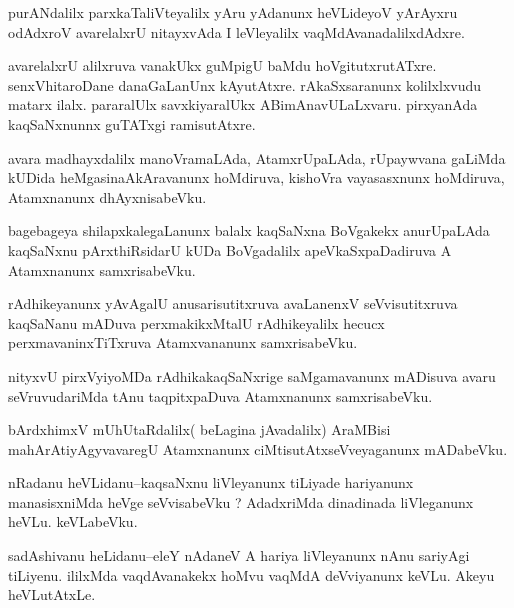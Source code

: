 \documentclass{article}
\begin{document}
\begin{mn}%
purANdalilx parxkaTaliVteyalilx yAru yAdanunx heVLideyoV yArAyxru odAdxroV avarelalxrU 
nitayxvAda I leVleyalilx vaqMdAvanadalilxdAdxre.
\end{mn}

\begin{mn}%
avarelalxrU alilxruva vanakUkx guMpigU baMdu hoVgitutxrutATxre. senxVhitaroDane 
danaGaLanUnx kAyutAtxre. rAkaSxsaranunx kolilxlxvudu matarx ilalx. pararalUlx 
savxkiyaralUkx ABimAnavULaLxvaru. pirxyanAda kaqSaNxnunnx guTATxgi ramisutAtxre.
\end{mn}

\begin{mn}%
avara madhayxdalilx manoVramaLAda, AtamxrUpaLAda, rUpaywvana gaLiMda kUDida 
heMgasinaAkAravanunx hoMdiruva, kishoVra vayasasxnunx hoMdiruva, Atamxnanunx 
dhAyxnisabeVku.
\end{mn}

\begin{mn}%
bagebageya shilapxkalegaLanunx balalx kaqSaNxna BoVgakekx anurUpaLAda kaqSaNxnu 
pArxthiRsidarU kUDa BoVgadalilx apeVkaSxpaDadiruva A Atamxnanunx samxrisabeVku.
\end{mn}

\begin{mn}%
rAdhikeyanunx yAvAgalU anusarisutitxruva avaLanenxV seVvisutitxruva kaqSaNanu mADuva 
perxmakikxMtalU rAdhikeyalilx hecucx perxmavaninxTiTxruva Atamxvananunx samxrisabeVku.
\end{mn}

\begin{mn}%
nityxvU pirxVyiyoMDa rAdhikakaqSaNxrige saMgamavanunx mADisuva avaru seVruvudariMda tAnu 
taqpitxpaDuva Atamxnanunx samxrisabeVku.
\end{mn}

\begin{mn}%
bArdxhimxV mUhUtaRdalilx( beLagina jAvadalilx) AraMBisi mahArAtiyAgyvavaregU Atamxnanunx 
ciMtisutAtxseVveyaganunx mADabeVku.
\end{mn}

\begin{mn}%
nRadanu heVLidanu--kaqsaNxnu liVleyanunx tiLiyade hariyanunx manasisxniMda heVge 
seVvisabeVku ? AdadxriMda dinadinada liVleganunx heVLu. keVLabeVku.
\end{mn}

\begin{mn}%
sadAshivanu heLidanu--eleY nAdaneV A hariya liVleyanunx nAnu sariyAgi tiLiyenu. ililxMda 
vaqdAvanakekx hoMvu vaqMdA deVviyanunx keVLu. Akeyu heVLutAtxLe.
\end{mn}
\end{document}
